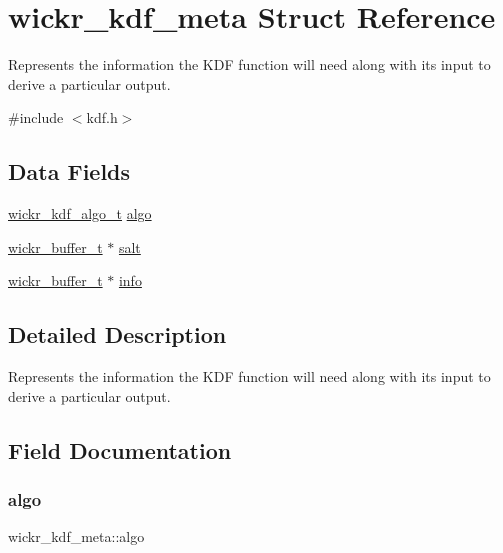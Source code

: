 \hypertarget{structwickr__kdf__meta}{}\section{wickr\+\_\+kdf\+\_\+meta Struct Reference}
\label{structwickr__kdf__meta}


Represents the information the K\+DF function will need along with it\textquotesingle{}s input to derive a particular output.  




{\ttfamily \#include $<$kdf.\+h$>$}

\subsection*{Data Fields}
\begin{DoxyCompactItemize}
\item 
\mbox{\hyperlink{structwickr__kdf__algo}{wickr\+\_\+kdf\+\_\+algo\+\_\+t}} \mbox{\hyperlink{structwickr__kdf__meta_a263e1f7c77447a5a2a57c0d5d2f4ee34}{algo}}
\item 
\mbox{\hyperlink{structwickr__buffer}{wickr\+\_\+buffer\+\_\+t}} $\ast$ \mbox{\hyperlink{structwickr__kdf__meta_a315c54ee4578a01266a4e7352a52d459}{salt}}
\item 
\mbox{\hyperlink{structwickr__buffer}{wickr\+\_\+buffer\+\_\+t}} $\ast$ \mbox{\hyperlink{structwickr__kdf__meta_abf3edef445c8849c356d1282e49033f4}{info}}
\end{DoxyCompactItemize}


\subsection{Detailed Description}
Represents the information the K\+DF function will need along with it\textquotesingle{}s input to derive a particular output. 

\subsection{Field Documentation}
\mbox{\label{structwickr__kdf__meta_a263e1f7c77447a5a2a57c0d5d2f4ee34}} 
\subsubsection{\texorpdfstring{algo}{algo}}
{\footnotesize\ttfamily wickr\+\_\+kdf\+\_\+meta\+::algo}

